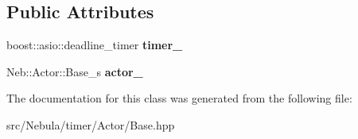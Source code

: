 \subsection*{\-Public \-Attributes}
\begin{DoxyCompactItemize}
\item 
\hypertarget{classNeb_1_1Timer_1_1Actor_1_1Base_a901f924d54f4d8c44244586a270df37e}{boost\-::asio\-::deadline\-\_\-timer {\bfseries timer\-\_\-}}\label{classNeb_1_1Timer_1_1Actor_1_1Base_a901f924d54f4d8c44244586a270df37e}

\item 
\hypertarget{classNeb_1_1Timer_1_1Actor_1_1Base_a5a0ec18683dbdca73575cb843369f073}{\-Neb\-::\-Actor\-::\-Base\-\_\-s {\bfseries actor\-\_\-}}\label{classNeb_1_1Timer_1_1Actor_1_1Base_a5a0ec18683dbdca73575cb843369f073}

\end{DoxyCompactItemize}


\-The documentation for this class was generated from the following file\-:\begin{DoxyCompactItemize}
\item 
src/\-Nebula/timer/\-Actor/\-Base.\-hpp\end{DoxyCompactItemize}
